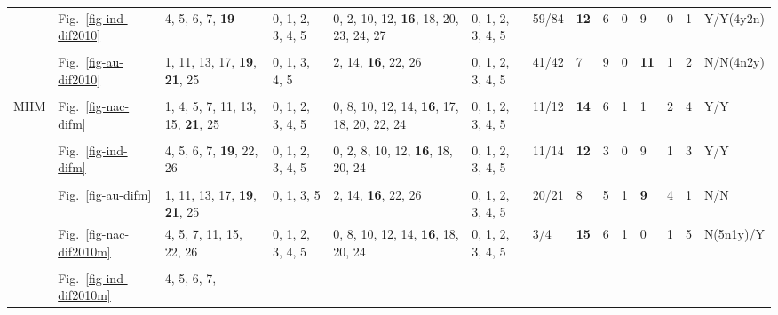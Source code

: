\begin{table*}
{\begin{tabular}{l|l|l|l|l|l|l|l|l|l|l|l|l|l}
& Fig.~\ref{fig-ind-dif2010} & \multirow{2}{*}{\parbox{2cm}{4, 5, 6, 7,
  \textbf{19}}} & \multirow{2}{*}{\parbox{1cm}{0, 1, 2, 3, 4, 5}} &
  \multirow{2}{*}{\parbox{2.4cm}{0, 2, 10, 12, \textbf{16}, 18, 20, 23, 24, 27}} &
  \multirow{2}{*}{\parbox{1cm}{0, 1, 2, 3, 4, 5}} & 59/84 & \textbf{12} & 6 & 0 & 9 & 0
  & 1 & Y/Y(4y2n) \\ \\ \cline{2-14}
& Fig.~\ref{fig-au-dif2010} & \multirow{2}{*}{\parbox{2cm}{1, 11, 13, 17,
\textbf{19}, \textbf{21}, 25}} & \multirow{2}{*}{\parbox{1cm}{0, 1, 3, 4, 5}} &
  \multirow{2}{*}{\parbox{2cm}{2, 14, \textbf{16}, 22, 26}} &
  \multirow{2}{*}{\parbox{1cm}{0, 1, 2, 3, 4, 5}} & 41/42 & 7 & 9 & 0 & \textbf{11} & 1
  & 2 & N/N(4n2y) \\ \\ \hline
\multirow{12}{*}{MHM}
& Fig.~\ref{fig-nac-difm} & \multirow{2}{*}{\parbox{2cm}{1, 4, 5, 7, 11, 13, 15,
  \textbf{21}, 25}} & \multirow{2}{*}{\parbox{1cm}{0, 1, 2, 3, 4, 5}} &
  \multirow{2}{*}{\parbox{2.2cm}{0, 8, 10, 12, 14, \textbf{16}, 17, 18, 20, 22, 24}} &
  \multirow{2}{*}{\parbox{1cm}{0, 1, 2, 3, 4, 5}} & 11/12 & \textbf{14} & 6 & 1 & 1 & 2
  & 4 & Y/Y \\ \\ \cline{2-14}
& Fig.~\ref{fig-ind-difm} & \multirow{2}{*}{\parbox{2cm}{4, 5, 6, 7, \textbf{19}, 22, 26}} &
  \multirow{2}{*}{\parbox{1cm}{0, 1, 2, 3, 4, 5}} &
  \multirow{2}{*}{\parbox{2.4cm}{0, 2, 8, 10, 12, \textbf{16}, 18, 20, 24}} &
  \multirow{2}{*}{\parbox{1cm}{0, 1, 2, 3, 4, 5}} & 11/14 & \textbf{12} & 3 & 0 & 9 & 1
  & 3 & Y/Y \\ \\ \cline{2-14}
& Fig.~\ref{fig-au-difm} & \multirow{2}{*}{\parbox{2cm}{1, 11, 13, 17,
  \textbf{19}, \textbf{21}, 25}} & \multirow{2}{*}{\parbox{1cm}{0, 1, 3, 5}} &
  \multirow{2}{*}{\parbox{2.4cm}{2, 14, \textbf{16}, 22, 26}} &
  \multirow{2}{*}{\parbox{1cm}{0, 1, 2, 3, 4, 5}} & 20/21 & 8 & 5 & 1 & \textbf{9} & 4
  & 1 & N/N \\ \\ \cline{2-14}
& Fig.~\ref{fig-nac-dif2010m} & \multirow{2}{*}{\parbox{2cm}{4, 5, 7, 11,
  15, 22, 26}} & \multirow{2}{*}{\parbox{1cm}{0, 1, 2, 3, 4, 5}} &
  \multirow{2}{*}{\parbox{2.4cm}{0, 8, 10, 12, 14, \textbf{16}, 18, 20, 24}} &
  \multirow{2}{*}{\parbox{1cm}{0, 1, 2, 3, 4, 5}} & 3/4 & \textbf{15} & 6 & 1 & 0 & 1 &
  5 & N(5n1y)/Y \\ \\ \cline{2-14}
& Fig.~\ref{fig-ind-dif2010m} & \multirow{2}{*}{\parbox{2cm}{4, 5, 6, 7,
}}
\end{tabular}}
\end{table*}
